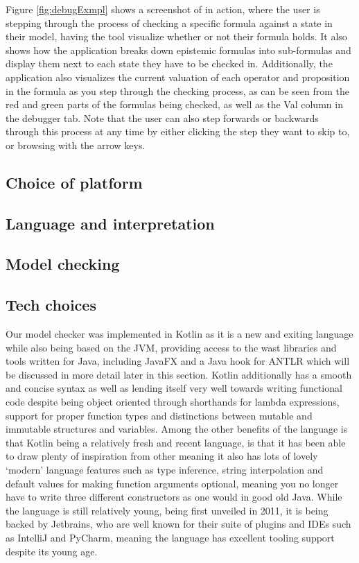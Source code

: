 Figure \ref{fig:debugExmpl} shows a screenshot of \cname in action, where the user is stepping through the process of checking a specific formula against a state in their model, having the tool visualize whether or not their formula holds. It also shows how the application breaks down epistemic formulas into sub-formulas and display them next to each state they have to be checked in. Additionally, the application also visualizes the current valuation of each operator and proposition in the formula as you step through the checking process, as can be seen from the red and green parts of the formulas being checked, as well as the Val column in the debugger tab. Note that the user can also step forwards or backwards through this process at any time by either clicking the step they want to skip to, or browsing with the arrow keys. 


\subsection{Choice of platform}

\subsection{Language and interpretation}

\subsection{Model checking}


\subsection{Tech choices}

Our model checker was implemented in Kotlin as it is a new and exiting language while also being based on the JVM, providing access to the wast libraries and tools written for Java, including JavaFX and a Java hook for ANTLR which will be discussed in more detail later in this section. Kotlin additionally has a smooth and concise syntax as well as lending itself very well towards writing functional code despite being object oriented through shorthands for lambda expressions, support for proper function types and distinctions between mutable and immutable structures and variables. Among the other benefits of the language is that Kotlin being a relatively fresh and recent language, is that it has been able to draw plenty of inspiration from other  meaning it also has lots of lovely `modern' language features such as type inference, string interpolation and default values for making function arguments optional, meaning you no longer have to write three different constructors as one would in good old Java. While the language is still relatively young, being first unveiled in 2011\cite{KotlinHello}, it is being backed by Jetbrains, who are well known for their suite of plugins and IDEs such as IntelliJ and PyCharm, meaning the language has excellent tooling support despite its young age.

